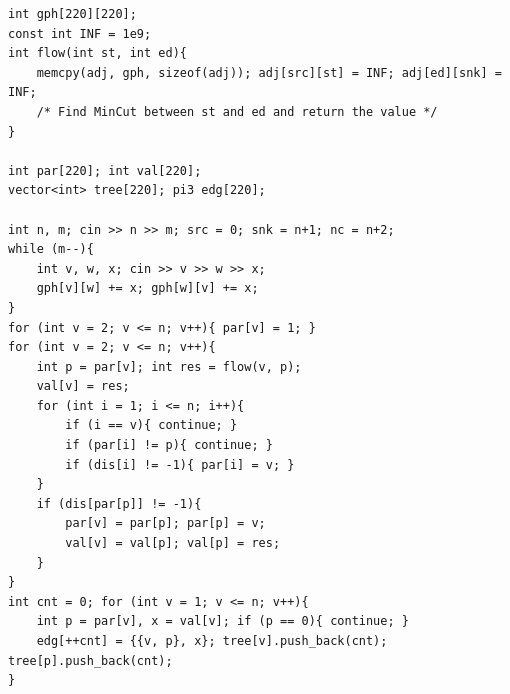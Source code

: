 \begin{verbatim}
int gph[220][220];
const int INF = 1e9;
int flow(int st, int ed){
	memcpy(adj, gph, sizeof(adj)); adj[src][st] = INF; adj[ed][snk] = INF;
	/* Find MinCut between st and ed and return the value */
}

int par[220]; int val[220];
vector<int> tree[220]; pi3 edg[220];

int n, m; cin >> n >> m; src = 0; snk = n+1; nc = n+2;
while (m--){
	int v, w, x; cin >> v >> w >> x;
	gph[v][w] += x; gph[w][v] += x;
}
for (int v = 2; v <= n; v++){ par[v] = 1; }
for (int v = 2; v <= n; v++){
	int p = par[v]; int res = flow(v, p);
	val[v] = res;
	for (int i = 1; i <= n; i++){
		if (i == v){ continue; }
		if (par[i] != p){ continue; }
		if (dis[i] != -1){ par[i] = v; }
	}
	if (dis[par[p]] != -1){
		par[v] = par[p]; par[p] = v;
		val[v] = val[p]; val[p] = res;
	}
}
int cnt = 0; for (int v = 1; v <= n; v++){
	int p = par[v], x = val[v]; if (p == 0){ continue; }
	edg[++cnt] = {{v, p}, x}; tree[v].push_back(cnt); tree[p].push_back(cnt);
}
\end{verbatim}